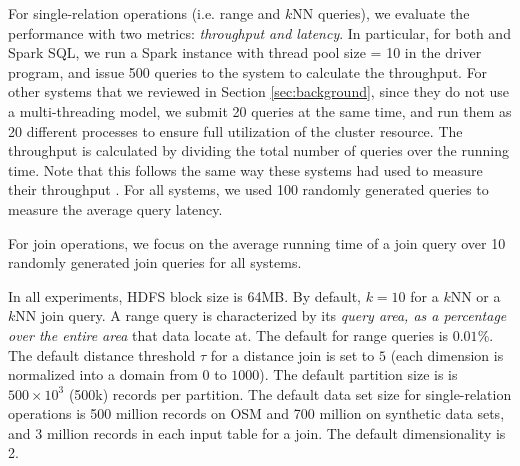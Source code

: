 For single-relation operations (i.e. range and $k$NN queries), we
evaluate the performance with two metrics: {\em throughput and
  latency}. In particular, for both \name and Spark SQL, we run a
Spark instance with thread pool size = 10 in the driver program, and
issue 500 queries to the system to calculate the throughput. For other
systems that we reviewed in Section \ref{sec:background}, since they
do not use a multi-threading model, we submit 20 queries at the same
time, and run them as 20 different processes to ensure full
utilization of the cluster resource. The throughput is calculated by
dividing the total number of queries over the running time. Note that
this follows the same way these systems had used to measure their
throughput \cite{spatialhadoop}.  For all systems, we used 100
randomly generated queries to measure the average query latency.

For join operations, we focus on the average running time of a join
query over 10 randomly generated join queries for all systems.

In all experiments, HDFS block size is 64MB. By default, $k=10$ for a
$k$NN or a $k$NN join query. A range query is characterized by its
{\em query area, as a percentage over the entire area} that data
locate at. The default for range queries is $0.01\%$. The default
distance threshold $\tau$ for a distance join is set to $5$ (each
dimension is normalized into a domain from $0$ to
$1000$).%
The default partition size is is $500\times 10^3$ (500k) records per
partition. The default data set size for single-relation operations is
500 million records on OSM and 700 million on synthetic data sets, and
3 million records in each input table for a join. The default
dimensionality is 2.







